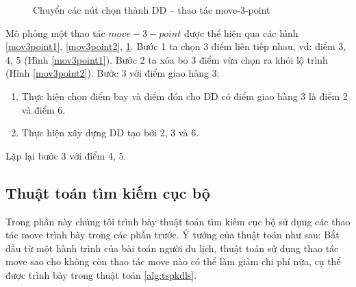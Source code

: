 \documentclass[a4paper,12pt]{report}
\begin{document}
\begin{figure}[H]

\caption{Chuyển các nút chọn thành DD -- thao tác move-3-point}\label{mov3point3}
\end{figure}

Mô phỏng một thao tác $move-3-point$ được thể hiện qua các hình \ref{mov3point1}, \ref{mov3point2}, \ref{mov3point3}. Bước 1 ta chọn 3 điểm liên tiếp nhau, vd:  điểm 3, 4, 5 (Hình \ref{mov3point1}). Bước 2 ta xóa bỏ 3 điểm vừa chọn ra khỏi lộ trình (Hình \ref{mov3point2}). Bước 3 với điểm giao hàng 3:\begin{enumerate}
\item Thực hiện chọn điểm bay và điểm đón cho DD có điểm giao hàng 3 là điểm 2 và điểm 6.
\item Thực hiện xây dựng DD tạo bởi 2, 3 và 6.
\end{enumerate} 
Lặp lại bước 3 với điểm 4, 5.
\subsection{Thuật toán tìm kiếm cục bộ}
\label{subsection:tspkdal}
Trong phần này chúng tôi trình bày thuật toán tìm kiếm cục bộ sử dụng các thao tác move trình bày trong các phần trước. Ý tưởng của thuật toán như sau: Bắt đầu từ một hành trình của bài toán người du lịch, thuật toán sử dụng thao tác move sao cho không còn thao tác move nào có thể làm giảm chi phí nữa, cụ thể được trình bày trong thuật toán \ref{alg:tspkdls}.
\end{document}

